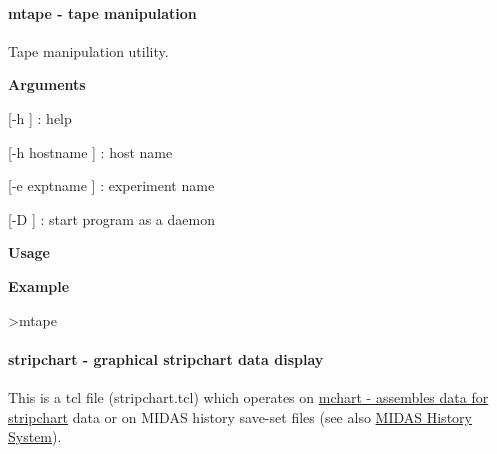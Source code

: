 \label{F_LogUtil_idx_mtape_utility}
\hypertarget{F_LogUtil_idx_mtape_utility}{}
 

 \hypertarget{F_LogUtil_F_mtape_utility}{}\paragraph{mtape  -\/ tape manipulation}\label{F_LogUtil_F_mtape_utility}
Tape manipulation utility.


\begin{DoxyItemize}
\item {\bfseries  Arguments }
\begin{DoxyItemize}
\item \mbox{[}-\/h \mbox{]} : help
\item \mbox{[}-\/h hostname \mbox{]} : host name
\item \mbox{[}-\/e exptname \mbox{]} : experiment name
\item \mbox{[}-\/D \mbox{]} : start program as a daemon
\end{DoxyItemize}
\end{DoxyItemize}


\begin{DoxyItemize}
\item {\bfseries  Usage }
\item {\bfseries  Example } 
\begin{DoxyCode}
 >mtape
\end{DoxyCode}

\end{DoxyItemize}



 \hypertarget{F_LogUtil_F_stripchartfile}{}\paragraph{stripchart   -\/ graphical stripchart data display}\label{F_LogUtil_F_stripchartfile}
This is a tcl file (stripchart.tcl) which operates on \hyperlink{F_LogUtil_F_mchart_utility}{mchart -\/ assembles data for stripchart} data or on MIDAS history save-\/set files (see also \hyperlink{F_History_logging_F_History_System}{MIDAS History System}).


